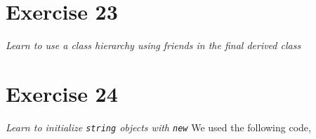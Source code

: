 \documentclass[12pt]{article}
\newcommand{\desc}[1]{\textit{#1} \vspace{1em}}
\begin{document}
\clearpage

\section*{Exercise 23}
\desc{Learn to use a class hierarchy using friends in the final derived class}

\clearpage

\section*{Exercise 24}
\desc{Learn to initialize \texttt{string} objects with \texttt{new}}
We used the following code,







\clearpage
\end{document}
